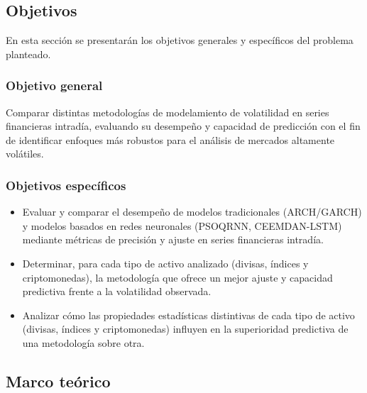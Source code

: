 \documentclass[12pt]{paper}
\begin{document}
\subsection[Objetivos]{Objetivos}
En esta sección se presentarán los objetivos generales y específicos del problema planteado.

\subsubsection[Objetivo general]{Objetivo general}

Comparar distintas metodologías de modelamiento de volatilidad en series financieras intradía, evaluando su desempeño y capacidad de predicción con el fin de identificar enfoques más robustos para el análisis de mercados altamente volátiles.
\subsubsection[Objetivos específicos]{Objetivos específicos}

\begin {itemize}
\item Evaluar y comparar el desempeño de modelos tradicionales (ARCH/GARCH) y modelos basados en redes neuronales (PSOQRNN, CEEMDAN-LSTM) mediante métricas de precisión y ajuste en series financieras intradía.
\item Determinar, para cada tipo de activo analizado (divisas, índices y criptomonedas), la metodología que ofrece un mejor ajuste y capacidad predictiva frente a la volatilidad observada.
\item  Analizar cómo las propiedades estadísticas distintivas de cada tipo de activo (divisas, índices y criptomonedas) influyen en la superioridad predictiva de una metodología sobre otra.
\end{itemize}

\subsection[Marco teórico]{Marco teórico}
\end{document}
